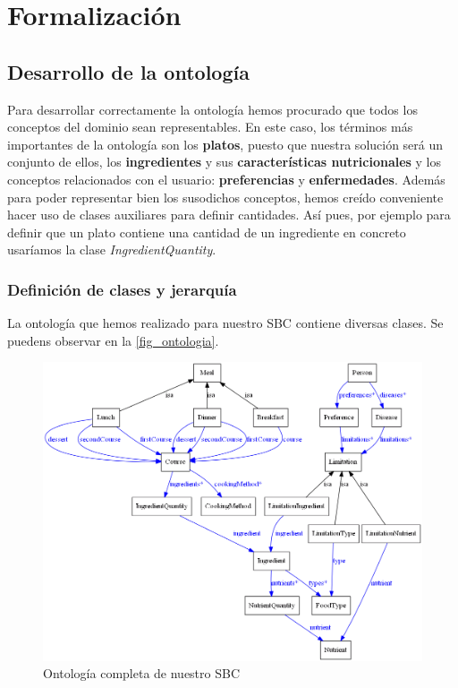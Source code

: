 \documentclass[11]{article}
\begin{document}
\section{Formalización}

\subsection{Desarrollo de la ontología}
Para desarrollar correctamente la ontología hemos procurado que todos los conceptos del dominio sean representables. En este caso, los términos más importantes de la ontología son los \textbf{platos}, puesto que nuestra solución será un conjunto de ellos, los \textbf{ingredientes} y sus \textbf{características nutricionales} y los conceptos relacionados con el usuario: \textbf{preferencias} y \textbf{enfermedades}. Además para poder representar bien los susodichos conceptos, hemos creído conveniente hacer uso de clases auxiliares para definir cantidades. Así pues, por ejemplo para definir que un plato contiene una cantidad de un ingrediente en concreto usaríamos la clase \textit{IngredientQuantity}.
\label{ontologia_apartado}
\subsubsection{Definición de clases y jerarquía}

La ontología que hemos realizado para nuestro SBC contiene diversas clases. Se puedens observar en la \autoref{fig_ontologia}.

\begin{figure}[H]
\centering
\includegraphics[width=\textwidth,height=\textheight,keepaspectratio]{images/full_light.png}
\caption{Ontología completa de nuestro SBC}
\label{fig_ontologia}
\end{figure}
\end{document}

